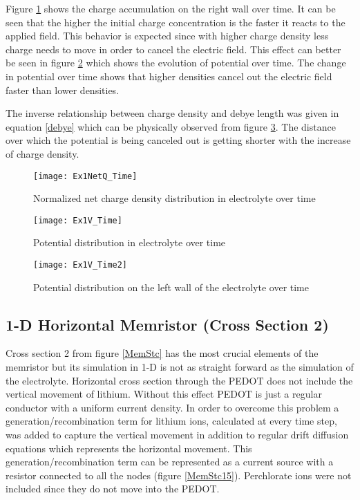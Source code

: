 Figure \ref{ElectrolyteQzoom} shows the charge accumulation on the right wall over time. It can be seen that the higher the initial charge concentration is the faster it reacts to the applied field. This behavior is expected since with higher charge density less charge needs to move in order to cancel the electric field. This effect can better be seen in figure \ref{ElectrolyteV} which shows the evolution of potential over time. The change in potential over time shows that higher densities cancel out the electric field faster than lower densities.

The inverse relationship between charge density and debye length was given in equation \ref{debye} which can be physically observed from figure  \ref{ElectrolyteV2}. The distance over which the potential is being canceled out is getting shorter with the increase of charge density.  

 
\begin{landscape}
\begin{figure}[!htp]
\centering
\texttt{[image: Ex1NetQ\_Time]}
\caption{Normalized net charge density distribution in electrolyte over time} 
\label{ElectrolyteQzoom}
\end{figure}
\end{landscape}

\begin{landscape}
\begin{figure}[!htp]
\centering
\texttt{[image: Ex1V\_Time]}
\caption{Potential distribution in electrolyte over time} 
\label{ElectrolyteV}
\end{figure}
\end{landscape}

 
\begin{landscape}
\begin{figure}[!htp]
\centering
\texttt{[image: Ex1V\_Time2]}
\caption{Potential distribution on the left wall of the electrolyte over time} 
\label{ElectrolyteV2}
\end{figure}
\end{landscape}

\clearpage
\subsection{1-D Horizontal Memristor (Cross Section 2)}

Cross section 2 from figure \ref{MemStc} has the most crucial elements of the memristor but its simulation in 1-D is not as straight forward as the simulation of the electrolyte. Horizontal cross section through the PEDOT does not include the vertical movement of lithium. Without this effect PEDOT is just a regular conductor with a uniform current density. In order to overcome this problem a generation/recombination term for lithium ions, calculated at every time step, was added to capture the vertical movement in addition to regular drift diffusion equations which represents the horizontal movement. This generation/recombination term can be represented as a current source with a resistor connected to all the nodes (figure \ref{MemStc15}). Perchlorate ions were not included since they do not move into the PEDOT.

